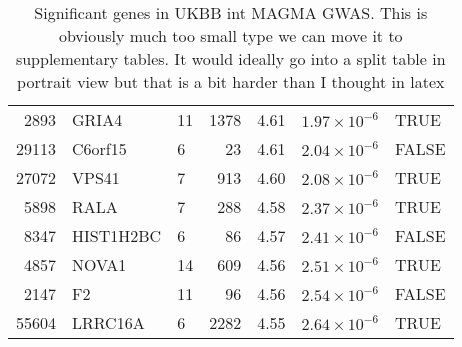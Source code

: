 \begin{table}[ht]
\begin{adjustbox}{totalheight=10in}
\begin{tabular}{rllrrrl}
  2893 & GRIA4 & 11 & 1378 & 4.61 & $1.97 \times 10^{-6}$ & TRUE \\ 
  29113 & C6orf15 & 6 &  23 & 4.61 & $2.04 \times 10^{-6}$ & FALSE \\ 
  27072 & VPS41 & 7 & 913 & 4.60 & $2.08 \times 10^{-6}$ & TRUE \\ 
  5898 & RALA & 7 & 288 & 4.58 & $2.37 \times 10^{-6}$ & TRUE \\ 
  8347 & HIST1H2BC & 6 &  86 & 4.57 & $2.41 \times 10^{-6}$ & FALSE \\ 
  4857 & NOVA1 & 14 & 609 & 4.56 & $2.51 \times 10^{-6}$ & TRUE \\ 
  2147 & F2 & 11 &  96 & 4.56 & $2.54 \times 10^{-6}$ & FALSE \\ 
  55604 & LRRC16A & 6 & 2282 & 4.55 & $2.64 \times 10^{-6}$ & TRUE \\ 
   \hline
\end{tabular}
\end{adjustbox}
\caption{Significant genes in UKBB int MAGMA GWAS. This is obviously much too small type we can move it to supplementary tables. It would ideally go into a split table in portrait view but that is a bit harder than I thought in latex} 
\label{tab:Significant genes in UKBB int MAGMA GWAS}
\end{table}



